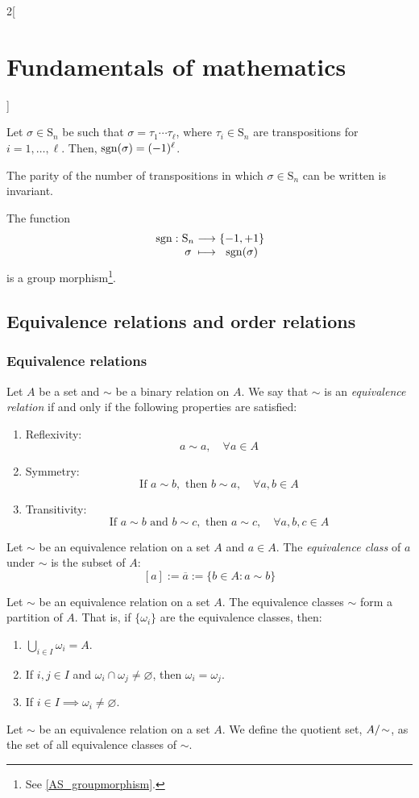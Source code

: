 \documentclass[../../../main.tex]{subfiles}
\begin{document}
\begin{multicols}{2}[\section{Fundamentals of mathematics}]
\begin{corollary}
    Let $\sigma\in \text{S}_n$ be such that $\sigma=\tau_1\cdots\tau_\ell$, where $\tau_i\in \text{S}_n$ are transpositions for $i=1,\ldots,\ell$. Then, $\operatorname{sgn}(\sigma)=(-1)^\ell$.
  \end{corollary}
  \begin{corollary}
    The parity of the number of transpositions in which $\sigma\in \text{S}_n$ can be written is invariant.
  \end{corollary}
  \begin{corollary}
    The function
    $$\function{\sign}{\text{S}_n}{\{-1,+1\}}{\sigma}{\sign(\sigma)}$$
    is a group morphism\footnote{See \cref{AS_groupmorphism}.}.
  \end{corollary}
  \subsection{Equivalence relations and order relations}
  \subsubsection{Equivalence relations}
  \begin{definition}
    Let $A$ be a set and $\sim$ be a binary relation on $A$. We say that $\sim$ is an \emph{equivalence relation} if and only if the following properties are satisfied:
    \begin{enumerate}
      \item Reflexivity: $$a\sim a,\quad\forall a\in A$$
      \item Symmetry: $$\text{If }a\sim b, \text{ then }b\sim a,\quad\forall a,b\in A$$
      \item Transitivity:
            $$\text{If }a\sim b\text{ and }b\sim c,\text{ then }a\sim c,\quad\forall a,b,c\in A$$
    \end{enumerate}
  \end{definition}
  \begin{definition}
    Let $\sim$ be an equivalence relation on a set $A$ and $a\in A$. The \emph{equivalence class} of $a$ under $\sim$ is the subset of $A$: $$[a]:=\overline{a}:=\{b\in A: a\sim b\}$$
  \end{definition}
  \begin{theorem}
    Let $\sim$ be an equivalence relation on a set $A$. The equivalence classes $\sim$ form a partition of $A$. That is, if $\{\omega_i\}$ are the equivalence classes, then:
    \begin{enumerate}
      \item $\bigcup_{i\in I} \omega_i=A$.
      \item If $i,j\in I$ and $\omega_i\cap\omega_j\ne\varnothing$, then $\omega_i=\omega_j$.
      \item If $i\in I\implies\omega_i\ne\varnothing$.
    \end{enumerate}
  \end{theorem}
  \begin{definition}
    Let $\sim$ be an equivalence relation on a set $A$. We define the quotient set, $\quot{A}{\!\sim}$, as the set of all equivalence classes of $\sim$.
  \end{definition}

\end{multicols}
\end{document}
